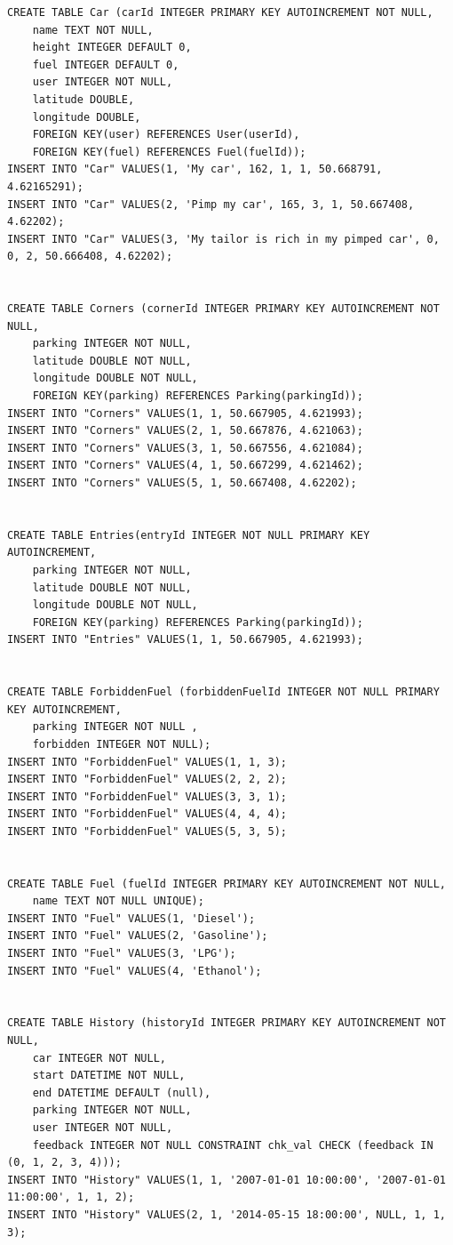 \documentclass[a4paper,11pt]{article}
\begin{document}
\begin{lstlisting}
CREATE TABLE Car (carId INTEGER PRIMARY KEY AUTOINCREMENT NOT NULL,
	name TEXT NOT NULL,
	height INTEGER DEFAULT 0,
	fuel INTEGER DEFAULT 0,
	user INTEGER NOT NULL,
	latitude DOUBLE,
	longitude DOUBLE,
	FOREIGN KEY(user) REFERENCES User(userId),
	FOREIGN KEY(fuel) REFERENCES Fuel(fuelId));
INSERT INTO "Car" VALUES(1, 'My car', 162, 1, 1, 50.668791, 4.62165291);
INSERT INTO "Car" VALUES(2, 'Pimp my car', 165, 3, 1, 50.667408, 4.62202);
INSERT INTO "Car" VALUES(3, 'My tailor is rich in my pimped car', 0, 0, 2, 50.666408, 4.62202);


CREATE TABLE Corners (cornerId INTEGER PRIMARY KEY AUTOINCREMENT NOT NULL,
	parking INTEGER NOT NULL,
	latitude DOUBLE NOT NULL,
	longitude DOUBLE NOT NULL,
	FOREIGN KEY(parking) REFERENCES Parking(parkingId));
INSERT INTO "Corners" VALUES(1, 1, 50.667905, 4.621993);
INSERT INTO "Corners" VALUES(2, 1, 50.667876, 4.621063);
INSERT INTO "Corners" VALUES(3, 1, 50.667556, 4.621084);
INSERT INTO "Corners" VALUES(4, 1, 50.667299, 4.621462);
INSERT INTO "Corners" VALUES(5, 1, 50.667408, 4.62202);


CREATE TABLE Entries(entryId INTEGER NOT NULL PRIMARY KEY AUTOINCREMENT,
	parking INTEGER NOT NULL,
	latitude DOUBLE NOT NULL,
	longitude DOUBLE NOT NULL,
	FOREIGN KEY(parking) REFERENCES Parking(parkingId));
INSERT INTO "Entries" VALUES(1, 1, 50.667905, 4.621993);


CREATE TABLE ForbiddenFuel (forbiddenFuelId INTEGER NOT NULL PRIMARY KEY AUTOINCREMENT,
	parking INTEGER NOT NULL ,
	forbidden INTEGER NOT NULL);
INSERT INTO "ForbiddenFuel" VALUES(1, 1, 3);
INSERT INTO "ForbiddenFuel" VALUES(2, 2, 2);
INSERT INTO "ForbiddenFuel" VALUES(3, 3, 1);
INSERT INTO "ForbiddenFuel" VALUES(4, 4, 4);
INSERT INTO "ForbiddenFuel" VALUES(5, 3, 5);


CREATE TABLE Fuel (fuelId INTEGER PRIMARY KEY AUTOINCREMENT NOT NULL,
	name TEXT NOT NULL UNIQUE);
INSERT INTO "Fuel" VALUES(1, 'Diesel');
INSERT INTO "Fuel" VALUES(2, 'Gasoline');
INSERT INTO "Fuel" VALUES(3, 'LPG');
INSERT INTO "Fuel" VALUES(4, 'Ethanol');


CREATE TABLE History (historyId INTEGER PRIMARY KEY AUTOINCREMENT NOT NULL,
	car INTEGER NOT NULL,
	start DATETIME NOT NULL,
	end DATETIME DEFAULT (null),
	parking INTEGER NOT NULL,
	user INTEGER NOT NULL,
	feedback INTEGER NOT NULL CONSTRAINT chk_val CHECK (feedback IN (0, 1, 2, 3, 4)));
INSERT INTO "History" VALUES(1, 1, '2007-01-01 10:00:00', '2007-01-01 11:00:00', 1, 1, 2);
INSERT INTO "History" VALUES(2, 1, '2014-05-15 18:00:00', NULL, 1, 1, 3);



\end{lstlisting}
\end{document}
